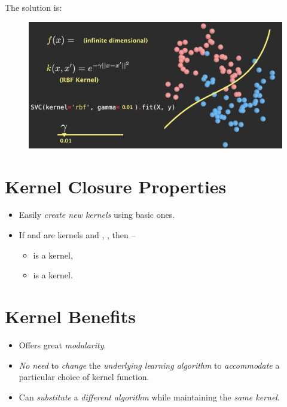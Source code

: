 \documentclass[
	number={2},
	title={Learning Linear Separators{,} SVMs and Kernels}
]{cs584notes}
\begin{document}
The solution is:


\begin{figure}[H]
	\centering
	\includegraphics[width=\textwidth]{figures/2/infinite-dimension}
	\caption{}
	\label{fig:infinite-dimension}
\end{figure}


\section{Kernel Closure Properties}\label{sec:kernel-closure-properties}
\begin{itemize}
	\item Easily \emph{create new kernels} using basic ones.
	\item If  and  are kernels and , , then --
	\begin{itemize}
		\item {} is a kernel,
		\item {} is a kernel.
	\end{itemize}
\end{itemize}

\section{Kernel Benefits}\label{sec:kernel-benefits}
\begin{itemize}
	\item Offers great \emph{modularity}.
	\item \emph{No need} to \emph{change} the \emph{underlying learning algorithm} to \emph{accommodate} a particular choice of kernel function.
	\item Can \emph{substitute} a \emph{different algorithm} while maintaining the \emph{same kernel}.
\end{itemize}
\end{document}
